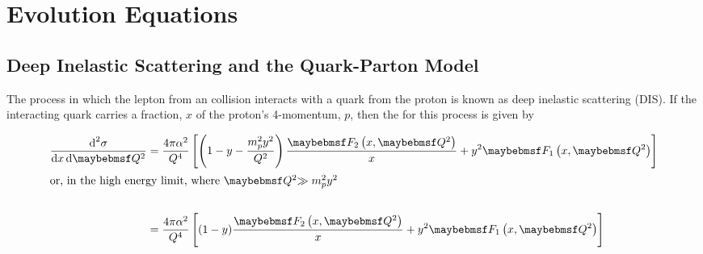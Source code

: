 \section{Evolution Equations}
\subsection{Deep Inelastic Scattering and the Quark-Parton Model}
The process in which the lepton from an \ep collision interacts with a quark from the proton is known as deep inelastic scattering (DIS).
If the interacting quark carries a fraction, $x$ of the proton's 4-momentum, $p$, then the \xs for this process is given by



\begin{align}
  \difDouble{\sigma}{x}{\Qsquared} &= \frac{4\pi\alpha^2}{Q^4} \left[ \left( 1 - y - \frac{m_p^2 y^2}{Q^2} \right) \frac{\F{2}}{x} + y^2 \F{1} \right] \\
  \intertext{or, in the high energy limit, where \Qsquared $\gg m_p^2y^2$} \nonumber \\
  &= \frac{4\pi\alpha^2}{Q^4} \left[ (1 - y) \frac{\F{2}}{x} + y^2 \F{1} \right]
  \label{eq:bg-theory:dsigmadQsquaredDIS}
\end{align}

